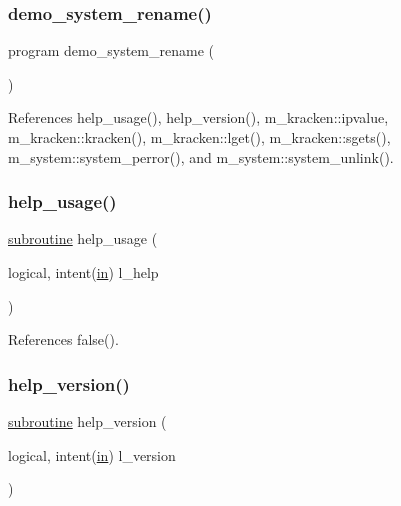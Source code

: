 \subsubsection{\texorpdfstring{demo\+\_\+system\+\_\+rename()}{demo\_system\_rename()}}
{\footnotesize\ttfamily program demo\+\_\+system\+\_\+rename (\begin{DoxyParamCaption}{ }\end{DoxyParamCaption})}



References help\+\_\+usage(), help\+\_\+version(), m\+\_\+kracken\+::ipvalue, m\+\_\+kracken\+::kracken(), m\+\_\+kracken\+::lget(), m\+\_\+kracken\+::sgets(), m\+\_\+system\+::system\+\_\+perror(), and m\+\_\+system\+::system\+\_\+unlink().

\mbox{\label{__unlink_8f90_a3e09a3b52ee8fb04eeb93fe5761626a8}} 
\subsubsection{\texorpdfstring{help\+\_\+usage()}{help\_usage()}}
{\footnotesize\ttfamily \hyperlink{M__stopwatch_83_8txt_acfbcff50169d691ff02d4a123ed70482}{subroutine} help\+\_\+usage (\begin{DoxyParamCaption}\item[{logical, intent(\hyperlink{M__journal_83_8txt_afce72651d1eed785a2132bee863b2f38}{in})}]{l\+\_\+help }\end{DoxyParamCaption})}



References false().

\mbox{\label{__unlink_8f90_a39c21619b08a3c22f19e2306efd7f766}} 
\subsubsection{\texorpdfstring{help\+\_\+version()}{help\_version()}}
{\footnotesize\ttfamily \hyperlink{M__stopwatch_83_8txt_acfbcff50169d691ff02d4a123ed70482}{subroutine} help\+\_\+version (\begin{DoxyParamCaption}\item[{logical, intent(\hyperlink{M__journal_83_8txt_afce72651d1eed785a2132bee863b2f38}{in})}]{l\+\_\+version }\end{DoxyParamCaption})}



